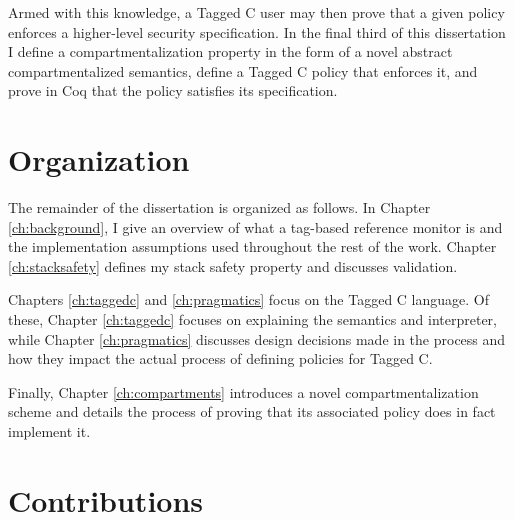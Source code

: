 \documentclass{report}
\begin{document}
Armed with this knowledge, a Tagged C user may then prove that a given policy enforces
a higher-level security specification. In the final third of this dissertation I define
a compartmentalization property in the form of
a novel abstract compartmentalized semantics, define a Tagged C policy that enforces it,
and prove in Coq that the policy satisfies its specification.

\section{Organization}

The remainder of the dissertation is organized as follows. In Chapter \ref{ch:background},
I give an overview of what a tag-based reference monitor is and the implementation assumptions
used throughout the rest of the work. Chapter \ref{ch:stacksafety} defines my stack safety
property and discusses validation.

Chapters \ref{ch:taggedc} and \ref{ch:pragmatics} focus on the Tagged C language. Of these,
Chapter \ref{ch:taggedc} focuses on explaining the semantics and interpreter, while 
Chapter \ref{ch:pragmatics} discusses design decisions made in the process and how they
impact the actual process of defining policies for Tagged C.

Finally, Chapter \ref{ch:compartments} introduces a novel compartmentalization scheme
and details the process of proving that its associated policy does in fact implement it.

\section{Contributions}
\end{document}
